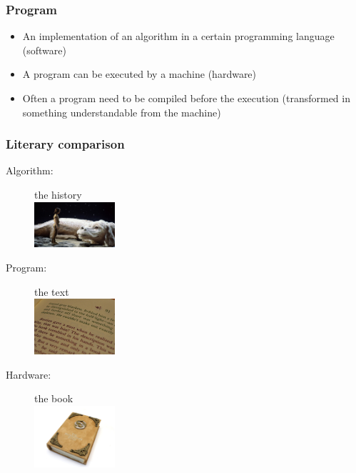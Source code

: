 \documentclass[pdftex, 11pt]{beamer}
\begin{document}
\begin{frame}
  \frametitle{Program}
  \begin{itemize}
  \item An implementation of an \alert{algorithm} in a certain
    \alert{programming language} (software)
    \pause
  \item A program can be \alert{executed} by a \alert{machine}
    (hardware)
    \pause
  \item Often a program need to be \alert{compiled} before the
    execution (\alert{transformed} in something understandable from the
    machine)
  \end{itemize}
\end{frame}

\begin{frame}
  \frametitle{Literary comparison}
  \begin{description}
  \item[Algorithm:] the history \\\includegraphics[width=3cm]{img/neverEndingStory1.jpeg}
  \item[Program:] the text\\\includegraphics[width=3cm]{img/neverEndingStory2.jpeg}
  \item[Hardware:] the book\\\includegraphics[width=3cm]{img/neverEndingStory3.jpeg}
  \end{description}
\end{frame}
\end{document}
